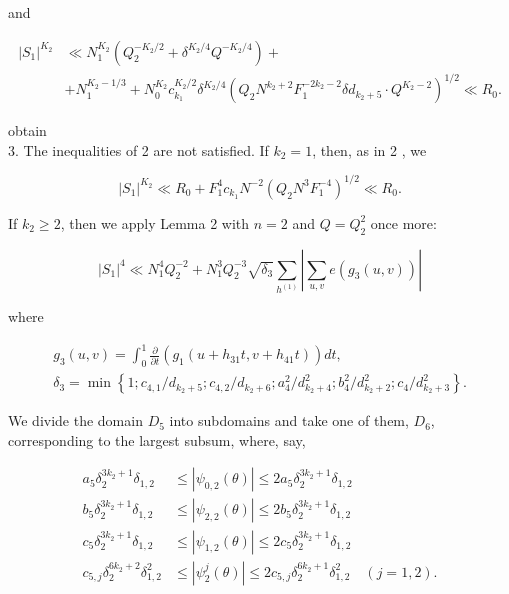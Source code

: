 \documentclass[10pt]{article}
\begin{document}
and

$$
\begin{aligned}
\left|S_{1}\right|^{K_{2}} & \ll N_{1}^{K_{2}}\left(Q_{2}^{-K_{2} / 2}+\delta^{K_{2} / 4} Q^{-K_{2} / 4}\right)+ \\
& +N_{1}^{K_{2}-1 / 3}+N_{0}^{K_{2}} c_{k_{1}}^{K_{2} / 2} \delta^{K_{2} / 4}\left(Q_{2} N^{k_{2}+2} F_{1}^{-2 k_{2}-2} \delta d_{k_{2}+5} \cdot Q^{K_{2}-2}\right)^{1 / 2} \ll R_{0} .
\end{aligned}
$$

obtain\\
3. The inequalities of 2 are not satisfied. If $k_{2}=1$, then, as in 2 , we

$$
\left|S_{1}\right|^{K_{2}} \ll R_{0}+F_{1}^{4} c_{k_{1}} N^{-2}\left(Q_{2} N^{3} F_{1}^{-4}\right)^{1 / 2} \ll R_{0} .
$$

If $k_{2} \geqslant 2$, then we apply Lemma 2 with $n=2$ and $Q=Q_{2}^{2}$ once more:


\begin{equation*}
\left|S_{1}\right|^{4} \ll N_{1}^{4} Q_{2}^{-2}+N_{1}^{3} Q_{2}^{-3} \sqrt{\delta_{3}} \sum_{h^{(1)}}\left|\sum_{u, v} e\left(g_{3}(u, v)\right)\right| \tag{10}
\end{equation*}


where

$$
\begin{gathered}
g_{3}(u, v)=\int_{0}^{1} \frac{\partial}{\partial t}\left(g_{1}\left(u+h_{31} t, v+h_{41} t\right)\right) d t, \\
\delta_{3}=\min \left\{1 ; c_{4,1} / d_{k_{2}+5} ; c_{4,2} / d_{k_{2}+6} ; a_{4}^{2} / d_{k_{2}+4}^{2} ; b_{4}^{2} / d_{k_{2}+2}^{2} ; c_{4} / d_{k_{2}+3}^{2}\right\} .
\end{gathered}
$$

We divide the domain $D_{5}$ into subdomains and take one of them, $D_{6}$, corresponding to the largest subsum, where, say,

$$
\begin{aligned}
a_{5} \delta_{2}^{3 k_{2}+1} \delta_{1,2} & \leqslant\left|\psi_{0,2}(\theta)\right| \leqslant 2 a_{5} \delta_{2}^{3 k_{2}+1} \delta_{1,2} \\
b_{5} \delta_{2}^{3 k_{2}+1} \delta_{1,2} & \leqslant\left|\psi_{2,2}(\theta)\right| \leqslant 2 b_{5} \delta_{2}^{3 k_{2}+1} \delta_{1,2} \\
c_{5} \delta_{2}^{3 k_{2}+1} \delta_{1,2} & \leqslant\left|\psi_{1,2}(\theta)\right| \leqslant 2 c_{5} \delta_{2}^{3 k_{2}+1} \delta_{1,2} \\
c_{5, j} \delta_{2}^{6 k_{2}+2} \delta_{1,2}^{2} & \leqslant\left|\psi_{2}^{j}(\theta)\right| \leqslant 2 c_{5, j} \delta_{2}^{6 k_{2}+1} \delta_{1,2}^{2} \quad(j=1,2) .
\end{aligned}
$$
\end{document}
